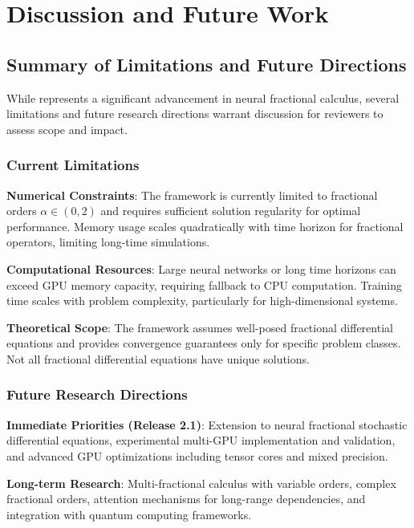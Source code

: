 \section{Discussion and Future Work}

\subsection{Summary of Limitations and Future Directions}

While \hpfracc represents a significant advancement in neural fractional calculus, several limitations and future research directions warrant discussion for reviewers to assess scope and impact.

\subsubsection{Current Limitations}

\textbf{Numerical Constraints}: The framework is currently limited to fractional orders $\alpha \in (0, 2)$ and requires sufficient solution regularity for optimal performance. Memory usage scales quadratically with time horizon for fractional operators, limiting long-time simulations.

\textbf{Computational Resources}: Large neural networks or long time horizons can exceed GPU memory capacity, requiring fallback to CPU computation. Training time scales with problem complexity, particularly for high-dimensional systems.

\textbf{Theoretical Scope}: The framework assumes well-posed fractional differential equations and provides convergence guarantees only for specific problem classes. Not all fractional differential equations have unique solutions.

\subsubsection{Future Research Directions}

\textbf{Immediate Priorities (Release 2.1)}: Extension to neural fractional stochastic differential equations, experimental multi-GPU implementation and validation, and advanced GPU optimizations including tensor cores and mixed precision.

\textbf{Long-term Research}: Multi-fractional calculus with variable orders, complex fractional orders, attention mechanisms for long-range dependencies, and integration with quantum computing frameworks.

